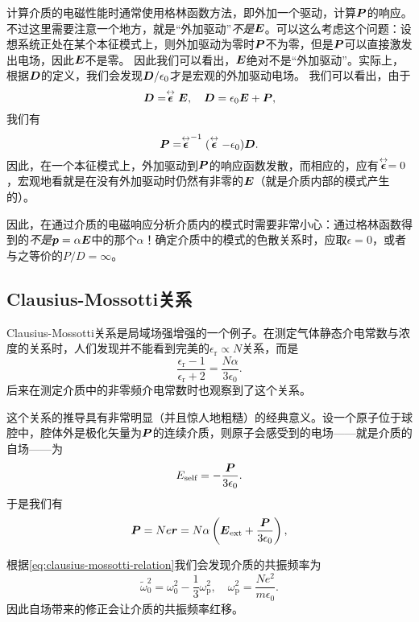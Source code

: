 计算介质的电磁性能时通常使用格林函数方法，即外加一个驱动，计算$\vb*{P}$的响应。不过这里需要注意一个地方，就是“外加驱动”\emph{不是}$\vb*{E}$。可以这么考虑这个问题：设想系统正处在某个本征模式上，则外加驱动为零时$\vb*{P}$不为零，但是$\vb*{P}$可以直接激发出电场，因此$\vb*{E}$不是零。
因此我们可以看出，$\vb*{E}$绝对不是“外加驱动”。实际上，根据$\vb*{D}$的定义，我们会发现$\vb*{D} / \epsilon_0$才是宏观的外加驱动电场。
我们可以看出，由于
\[
    \vb*{D} = \stackrel{\leftrightarrow}{\vb*{\vb*{\epsilon}}} \vb*{E}, \quad \vb*{D} = \epsilon_0 \vb*{E} + \vb*{P},
\]
我们有
\begin{equation}
    \vb*{P} = \stackrel{\leftrightarrow}{\vb*{\vb*{\epsilon}}}^{-1} (\stackrel{\leftrightarrow}{\vb*{\vb*{\epsilon}}} - \epsilon_0) \vb*{D}.
\end{equation}
因此，在一个本征模式上，外加驱动到$\vb*{P}$的响应函数发散，而相应的，应有$\stackrel{\leftrightarrow}{\vb*{\vb*{\epsilon}}} = 0$，宏观地看就是在没有外加驱动时仍然有非零的$\vb*{E}$（就是介质内部的模式产生的）。

因此，在通过介质的电磁响应分析介质内的模式时需要非常小心：通过格林函数得到的\emph{不是}$\vb*{p} = \alpha \vb*{E}$中的那个$\alpha$！确定介质中的模式的色散关系时，应取$\epsilon = 0$，或者与之等价的$P / D = \infty$。

\subsection{Clausius-Mossotti关系}

Clausius-Mossotti关系是局域场强增强的一个例子。在测定气体静态介电常数与浓度的关系时，人们发现并不能看到完美的$\epsilon_\text{r} \propto N$关系，而是
\begin{equation}
    \frac{\epsilon_\text{r} - 1}{\epsilon_\text{r} + 2} = \frac{N \alpha}{3 \epsilon_0}.
    \label{eq:clausius-mossotti-relation}
\end{equation}
后来在测定介质中的非零频介电常数时也观察到了这个关系。

这个关系的推导具有非常明显（并且惊人地粗糙）的经典意义。设一个原子位于球腔中，腔体外是极化矢量为$\vb*{P}$的连续介质，则原子会感受到的电场——就是介质的自场——为
\[
    E_\text{self} = - \frac{\vb*{P}}{3 \epsilon_0}.
\]
于是我们有
\[
    \vb*{P} = N e \vb*{r} = N \alpha \left( \vb*{E}_\text{ext} + \frac{\vb*{P}}{3 \epsilon_0} \right),
\]

根据\eqref{eq:clausius-mossotti-relation}我们会发现介质的共振频率为
\begin{equation}
    \tilde{\omega}_0^2 = \omega_0^2 - \frac{1}{3} \omega_\text{p}^2, \quad \omega_\text{p}^2 = \frac{N e^2}{m \epsilon_0}.
\end{equation}
因此自场带来的修正会让介质的共振频率红移。
